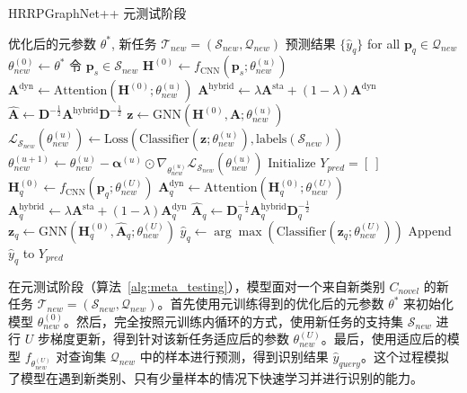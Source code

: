 \begin{algorithm}[htbp]
\caption{HRRPGraphNet++ 元测试阶段}
\label{alg:meta_testing}
\begin{algorithmic}[1]
    \REQUIRE 优化后的元参数 $\theta^*$, 新任务 $\mathcal{T}_{new} = (\mathcal{S}_{new}, \mathcal{Q}_{new})$
    \ENSURE 预测结果 $\{\hat{y}_q\}$ for all $\mathbf{p}_q \in \mathcal{Q}_{new}$
    \STATE $\theta_{new}^{(0)} \leftarrow \theta^*$ %
        \STATE 令 $\mathbf{p}_s \in \mathcal{S}_{new}$
        \STATE $\mathbf{H}^{(0)} \leftarrow f_{\text{CNN}}(\mathbf{p}_s; \theta_{new}^{(u)})$
        \STATE $\mathbf{A}^{\text{dyn}} \leftarrow \text{Attention}(\mathbf{H}^{(0)}; \theta_{new}^{(u)})$
        \STATE $\mathbf{A}^{\text{hybrid}} \leftarrow \lambda \mathbf{A}^{\text{sta}} + (1-\lambda) \mathbf{A}^{\text{dyn}}$
        \STATE $\hat{\mathbf{A}} \leftarrow \mathbf{D}^{-\frac{1}{2}} \mathbf{A}^{\text{hybrid}} \mathbf{D}^{-\frac{1}{2}}$
        \STATE $\mathbf{z} \leftarrow \text{GNN}(\mathbf{H}^{(0)}, \hat{\mathbf{A}}; \theta_{new}^{(u)})$
        \STATE $\mathcal{L}_{\mathcal{S}_{new}}(\theta_{new}^{(u)}) \leftarrow \text{Loss}( \text{Classifier}(\mathbf{z}; \theta_{new}^{(u)}), \text{labels}(\mathcal{S}_{new}) )$
        \STATE $\theta_{new}^{(u+1)} \leftarrow \theta_{new}^{(u)} - \boldsymbol{\alpha}^{(u)} \odot \nabla_{\theta_{new}^{(u)}} \mathcal{L}_{\mathcal{S}_{new}}(\theta_{new}^{(u)})$ %
    \ENDFOR
    \STATE %
    \STATE Initialize $Y_{pred} = [~]$
        \STATE $\mathbf{H}_q^{(0)} \leftarrow f_{\text{CNN}}(\mathbf{p}_q; \theta_{new}^{(U)})$
        \STATE $\mathbf{A}_q^{\text{dyn}} \leftarrow \text{Attention}(\mathbf{H}_q^{(0)}; \theta_{new}^{(U)})$
        \STATE $\mathbf{A}_q^{\text{hybrid}} \leftarrow \lambda \mathbf{A}^{\text{sta}} + (1-\lambda) \mathbf{A}_q^{\text{dyn}}$
        \STATE $\hat{\mathbf{A}}_q \leftarrow \mathbf{D}_q^{-\frac{1}{2}} \mathbf{A}_q^{\text{hybrid}} \mathbf{D}_q^{-\frac{1}{2}}$
        \STATE $\mathbf{z}_q \leftarrow \text{GNN}(\mathbf{H}_q^{(0)}, \hat{\mathbf{A}}_q; \theta_{new}^{(U)})$
        \STATE $\hat{y}_q \leftarrow \arg\max (\text{Classifier}(\mathbf{z}_q; \theta_{new}^{(U)}))$
        \STATE Append $\hat{y}_q$ to $Y_{pred}$
    \ENDFOR
\end{algorithmic}
\end{algorithm}
在元测试阶段（算法~\ref{alg:meta_testing}），模型面对一个来自新类别 $C_{novel}$ 的新任务 $\mathcal{T}_{new} = (\mathcal{S}_{new}, \mathcal{Q}_{new})$。首先使用元训练得到的优化后的元参数 $\theta^*$ 来初始化模型 $\theta_{new}^{(0)}$。然后，完全按照元训练内循环的方式，使用新任务的支持集 $\mathcal{S}_{new}$ 进行 $U$ 步梯度更新，得到针对该新任务适应后的参数 $\theta_{new}^{(U)}$。最后，使用适应后的模型 $f_{\theta_{new}^{(U)}}$ 对查询集 $\mathcal{Q}_{new}$ 中的样本进行预测，得到识别结果 $\hat{y}_{query}$。这个过程模拟了模型在遇到新类别、只有少量样本的情况下快速学习并进行识别的能力。

